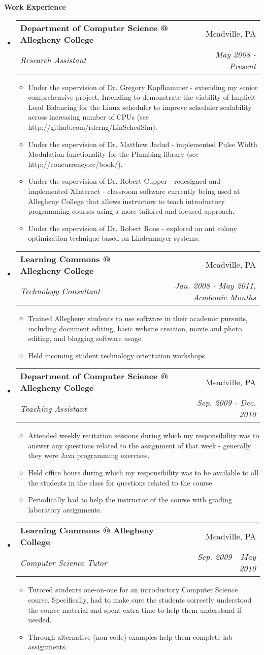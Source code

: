 \documentclass[letterpaper,11pt]{article}
\makeatletter
\newcommand{\resitem}[1]{\item #1 \vspace{-2pt}}
\newcommand{\resheading}[1]{{\large \colorbox{mygrey}{\begin{minipage}{\textwidth}{\textbf{#1 \vphantom{p\^{E}}}}\end{minipage}}}}
\newcommand{\ressubheading}[4]{
\begin{tabular*}{7.0in}{l@{\extracolsep{\fill}}r}
		\textbf{#1} & #2 \\
		\textit{#3} & \textit{#4} \\
\end{tabular*}\vspace{-6pt}}
\makeatother
\begin{document}
\resheading{Work Experience}
\begin{itemize}
\item
	\ressubheading{Department of Computer Science @ Allegheny College}{Meadville, PA}{Research Assistant}{May 2008 - Present}
	\begin{itemize}
	    \resitem{Under the supervision of Dr. Gregory Kapfhammer - extending my senior comprehensive project. Intending to demonstrate the viability of Implicit Load Balancing for the Linux scheduler to improve scheduler scalability across increasing number of CPUs (see http://github.com/rdcrng/LinSchedSim).}
		\resitem{Under the supervision of Dr. Matthew Jadud - implemented Pulse Width Modulation functionality for the Plumbing library (see http://concurrency.cc/book/).}
		\resitem{Under the supervision of Dr. Robert Cupper - redesigned and implemented XInteract - classroom software currently being used at Allegheny College that allows instructors to teach introductory programming courses using a more tailored and focused approach.}
		\resitem{Under the supervision of Dr. Robert Roos - explored an ant colony optimization technique based on Lindenmayer systems.}
	\end{itemize}
	
\item
	\ressubheading{Learning Commons @ Allegheny College}{Meadville, PA}{Technology Consultant}{Jan. 2008 - May 2011, Academic Months}
	\begin{itemize}
		\resitem{Trained Allegheny students to use software in their academic pursuits, including document editing, basic website creation, movie and photo editing, and blogging software usage.}
		\resitem{Held incoming student technology orientation workshops.}
	\end{itemize}

\item
	\ressubheading{Department of Computer Science @ Allegheny College}{Meadville, PA}{Teaching Assistant}{Sep. 2009 - Dec. 2010}
	\begin{itemize}
		\resitem{Attended weekly recitation sessions during which my responsibility was to answer any questions related to the assignment of that week - generally they were Java programming exercises.}
		\resitem{Held office hours during which my responsibility was to be available to all the students in the class for questions related to the course.}
		\resitem{Periodically had to help the instructor of the course with grading laboratory assignments.}
	\end{itemize}

\item
	\ressubheading{Learning Commons @ Allegheny College}{Meadville, PA}{Computer Science Tutor}{Sep. 2009 - May 2010}
	\begin{itemize}
		\resitem{Tutored students one-on-one for an introductory Computer Science course. Specifically, had to make sure the students correctly understood the course material and spent extra time to help them understand if needed. }
		\resitem{Through alternative (non-code) examples help them complete lab assignments.}
	\end{itemize}
	
\end{itemize}
\end{document}
